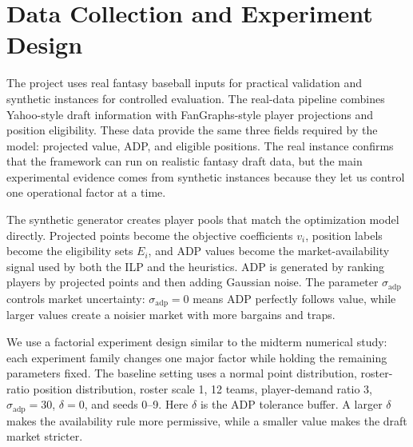 \documentclass[10pt,a4paper]{article}
\begin{document}
\section{Data Collection and Experiment Design}

The project uses real fantasy baseball inputs for practical validation and synthetic instances for controlled evaluation. The real-data pipeline combines Yahoo-style draft information with FanGraphs-style player projections and position eligibility. These data provide the same three fields required by the model: projected value, ADP, and eligible positions. The real instance confirms that the framework can run on realistic fantasy draft data, but the main experimental evidence comes from synthetic instances because they let us control one operational factor at a time.

The synthetic generator creates player pools that match the optimization model directly. Projected points become the objective coefficients $v_i$, position labels become the eligibility sets $E_i$, and ADP values become the market-availability signal used by both the ILP and the heuristics. ADP is generated by ranking players by projected points and then adding Gaussian noise. The parameter $\sigma_{\text{adp}}$ controls market uncertainty: $\sigma_{\text{adp}}=0$ means ADP perfectly follows value, while larger values create a noisier market with more bargains and traps.

We use a factorial experiment design similar to the midterm numerical study: each experiment family changes one major factor while holding the remaining parameters fixed. The baseline setting uses a normal point distribution, roster-ratio position distribution, roster scale 1, 12 teams, player-demand ratio 3, $\sigma_{\text{adp}}=30$, $\delta=0$, and seeds 0--9. Here $\delta$ is the ADP tolerance buffer. A larger $\delta$ makes the availability rule more permissive, while a smaller value makes the draft market stricter.
\end{document}
